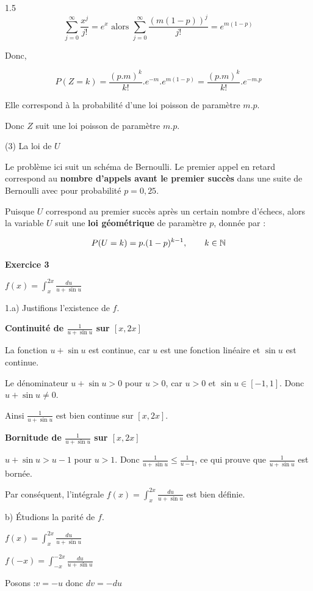 \documentclass[12pt]{article}
\begin{document}
\begin{spacing}{1.5}
\[\sum_{j=0}^{\infty}\frac{x^j}{j!}=e^x \text{ alors } \sum_{j=0}^{\infty}\frac{(m(1-p))^j}{j!}=e^{m(1-p)}\]

Donc,

\[P(Z=k)=\frac{(p.m)^k}{k!}.e^{-m}.e^{m(1-p)}=\frac{(p.m)^k}{k!}.e^{-m.p}\]

Elle correspond à la probabilité d'une loi poisson de paramètre $m.p$.

Donc $Z$ suit une loi poisson de paramètre $m.p$.

 
(3) La loi de $U$ 

Le problème ici suit un schéma de Bernoulli. Le premier appel en retard correspond au \textbf{ nombre d'appels avant le premier succès} dans une suite de Bernoulli avec pour probabilité $p=0,25$.

Puisque $U$ correspond au premier succès après un certain nombre d'échecs, alors la variable $U$ suit une \textbf{loi géométrique} de paramètre $p$, donnée par :

\[
P(U=k)=p.(1-p)^{k-1},\hspace{0.7cm} k\in \mathbb{N}\]

\medskip
\textbf{Exercice 3}

$f(x)=\int_{x}^{2x}\frac{du}{u+\sin u}$
 
 
 1.a) Justifions l'existence de $f$.
 
 
 \textbf{Continuité de $\frac{1}{u+\sin u}$ sur $[x,2x]$}
 
 La fonction $u+\sin u$ est continue, car $u$ est une fonction linéaire et $\sin u$ est continue.
 
 Le dénominateur $u+\sin u> 0$ pour $u>0$, car $u>0$ et $\sin u\in [-1,1]$. Donc $u+\sin u\neq 0$.
 
 Ainsi $\frac{1}{u+\sin u}$ est bien continue sur $[x,2x]$.
 
 \medskip
 \textbf{Bornitude de $\frac{1}{u+\sin u}$ sur $[x,2x]$}
 
 $u+\sin u>u-1$ pour $u>1$. Donc $\frac{1}{u+\sin u}\leq\frac{1}{u-1}$, ce qui prouve que $\frac{1}{u+\sin u}$ est bornée.
 
 Par conséquent, l'intégrale $f(x)=\int_{x}^{2x}\frac{du}{u+\sin u}$ est bien définie.
 
 
 
 b) Étudions la parité de $f$.
 
 $f(x)=\int_{x}^{2x}\frac{du}{u+\sin u}$
 
 $f(-x)=\int_{-x}^{-2x}\frac{du}{u+\sin u}$
 
 Posons :$v=-u$ donc $dv=-du$
 

\end{spacing}
\end{document}
